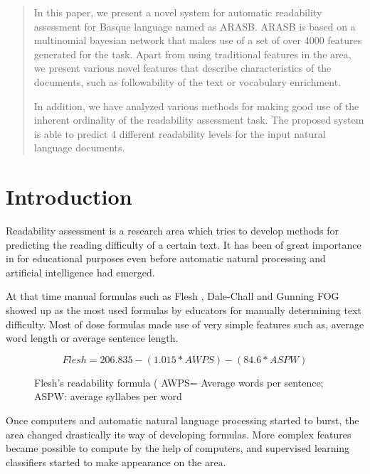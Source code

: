 \documentclass{acm_proc_article-sp}
\begin{document}
\maketitle
\begin{abstract}
In this paper, we present a novel system for automatic readability assessment for Basque language named as ARASB. ARASB is based on a multinomial bayesian network that makes use of a set of over 4000 features generated for the task. Apart from using traditional features in the area, we present various novel features that describe characteristics of the documents, such as followability of the text or vocabulary enrichment. 

In addition, we have analyzed various methods for making good use of the inherent ordinality of the readability assessment task. The proposed system is able to predict 4 different readability levels for the input natural language documents.


\end{abstract}





\section{Introduction}
Readability assessment is a research area which tries to develop methods for predicting the reading difficulty of a certain text. It has been of great importance in for educational purposes even before automatic natural processing and artificial intelligence had emerged.

At that time manual formulas such as Flesh \cite{flesch1948new}, Dale-Chall \cite{chall1995readability} and Gunning FOG  \cite{albright1996readability} showed up as the most used formulas by educators for manually determining text difficulty. Most of dose formulas made use of very simple features such as, average word length or average sentence length.

\begin{figure}[h]
\begin{equation}
 Flesh =  206.835 -(1.015 * AWPS) - (84.6 * ASPW)  
\end{equation}
\caption{Flesh's readability formula ( AWPS= Average words per sentence; ASPW: average syllabes per word}
\end{figure}

Once computers and automatic natural language processing started to burst, the area changed drastically its way of developing formulas. More complex features became possible to compute by the help of computers, and supervised learning classifiers started to make appearance on the area.
\end{document}
